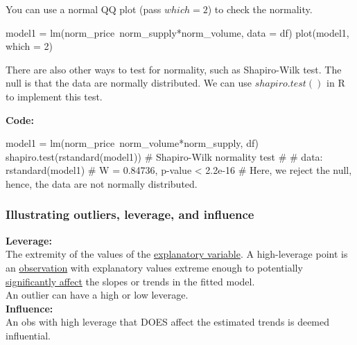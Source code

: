 \documentclass[12pt]{article}
\begin{document}
You can use a normal QQ plot (pass $ which = 2 $) to check the 
normality.

\begin{rc}
model1 = lm(norm_price~norm_supply*norm_volume, data = df)
plot(model1, which = 2)
\end{rc}




There are also other ways to test for normality, such as Shapiro-Wilk
test.
The null is that the data are normally distributed. We can use
$ shapiro.test() $ in R to implement this test.


{\textbf {Code:}}
\begin{rc}
model1 = lm(norm_price~norm_volume*norm_supply, df)
shapiro.test(rstandard(model1))
#         Shapiro-Wilk normality test
# 
# data:  rstandard(model1)
# W = 0.84736, p-value < 2.2e-16
# Here, we reject the null, hence, the data are not normally distributed. 
\end{rc}




\subsubsection{Illustrating outliers, leverage, and influence}

{\textbf {Leverage:}}\\
The extremity of the values of the {\underline {explanatory variable}}.
A high-leverage point is an {\underline {observation}} with 
explanatory values extreme enough to potentially 
{\underline {significantly affect}} the slopes or trends in the fitted
model.\\
An outlier can have a high or low leverage.\\

{\textbf {Influence:}}\\
An obs with high leverage that DOES affect the estimated trends is
deemed influential.
\end{document}
